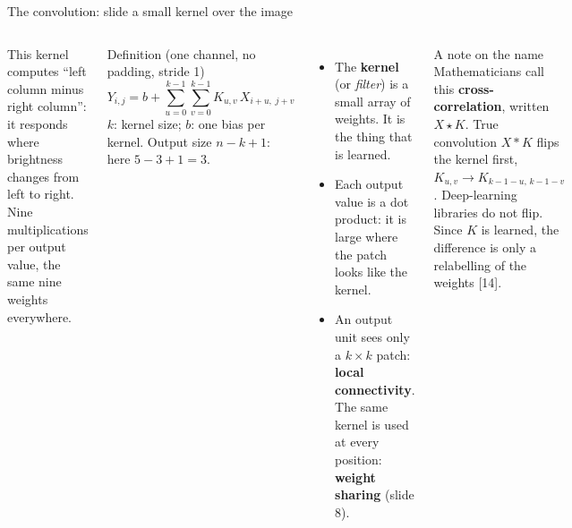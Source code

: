 \documentclass[aspectratio=169,10pt]{beamer}
\renewcommand{\cite}[1]{{\scriptsize\color{cTok}[#1]}}
\newcommand{\key}[1]{\textbf{\color{cAtt}#1}}
\newcommand{\xcorr}{\star}
\begin{document}
\begin{frame}{The convolution: slide a small kernel over the image}
\begin{columns}[T,onlytextwidth]
\vspace{1mm}
This kernel computes ``left column minus right column'': it responds where brightness changes
from left to right. Nine multiplications per output value, the same nine weights everywhere.
\small
\begin{block}{Definition (one channel, no padding, stride 1)}
\vspace{-2mm}
\[
  Y_{i,j}=b+\sum_{u=0}^{k-1}\sum_{v=0}^{k-1}K_{u,v}\,X_{i+u,\;j+v}
\]
\footnotesize $k$: kernel size; $b$: one bias per kernel. Output size $n-k+1$: here $5-3+1=3$.
\end{block}
\begin{itemize}\footnotesize
  \item The \key{kernel} (or \emph{filter}) is a small array of weights. It is the thing that is learned.
  \item Each output value is a dot product: it is large where the patch looks like the kernel.
  \item An output unit sees only a $k\times k$ patch: \key{local connectivity}. The same kernel
        is used at every position: \key{weight sharing} (slide 8).
\end{itemize}
\begin{block}{A note on the name}
\footnotesize
Mathematicians call this \key{cross-correlation}, written $X\xcorr K$. True convolution $X*K$ flips the
kernel first, $K_{u,v}\to K_{k-1-u,\,k-1-v}$. Deep-learning libraries do not flip.
Since $K$ is learned, the difference is only a relabelling of the weights \cite{14}.
\end{block}
\end{columns}
\end{frame}
\end{document}
